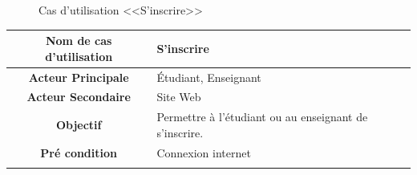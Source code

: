 \documentclass[12pt]{report}
\begin{document}
\vspace{-0.1in}

\begin{figure}[h]
\centering
    \centerline{}
    \vspace{-0.08in}
    \caption{Cas d'utilisation <<S'inscrire>>}
\end{figure}

\begin{table}[H]
\centering
\begin{tabular}{|c|l|}
\hline
\rowcolor[HTML]{ECF4FF}
\textbf{Nom de cas d'utilisation}  & S'inscrire                                                                                                                                                                                                                    \\ \hline
\rowcolor[HTML]{DAE8FC}
\textbf{Acteur Principale}         & Étudiant, Enseignant                                                                                                                                                                                                          \\ \hline
\rowcolor[HTML]{ECF4FF}
\textbf{Acteur Secondaire}         & Site Web                                                                                                                                                                                                                      \\ \hline
\rowcolor[HTML]{DAE8FC}
\textbf{Objectif}                  & Permettre à l'étudiant ou au enseignant de s'inscrire.                                                                                                                                                                        \\ \hline
\rowcolor[HTML]{ECF4FF}
\textbf{Pré condition}             & Connexion internet                                                                                                                                                                                                            \\ \hline
\rowcolor[HTML]{DAE8FC}

\end{tabular}
\end{table}
\end{document}
